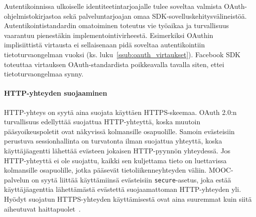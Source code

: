 \documentclass[finnish,gradu]{tktltiki}
\begin{document}
  Autentikoinnissa ulkoiselle identiteetintarjoajalle tulee soveltaa valmista OAuth-oh\-jelmisto\-kirjastoa sekä palveluntarjoajan omaa SDK-sovel\-lus\-kehitys\-välineistöä. Autentikointistandardin omatoiminen toteutus vie työaikaa ja turvallisuus vaarantuu pienestäkin implementointivirheestä. Esimerkiksi OAuthin implisiittistä virtausta ei sellaisenaan pidä soveltaa autentikointiin tietoturvaongelman vuoksi (ks. luku~\ref{ssub:oauth_virtaukset}). Facebook SDK toteuttaa virtauksen OAuth-standardista poikkeavalla tavalla siten, ettei tietoturvaongelmaa synny.


  \paragraph{HTTP-yhteyden suojaaminen} \hfill %
  \label{par:http_yhteyden_suojaaminen}

  HTTP-yhteys on syytä aina suojata käyttäen HTTPS-skeemaa. OAuth 2.0:n turvallisuus edellyttää suojattua HTTP-yhteyttä, koska muutoin pääsyoikeuspoletit ovat näkyvissä kolmansille osapuolille. Samoin evästeisiin perustuva sessionhallinta on turvatonta ilman suojattua yhteyttä, koska käyttäjäagentti lähettää evästeen jokaisen HTTP-pyynnön yhteydessä. Jos HTTP-yhteyttä ei ole suojattu, kaikki sen kuljettama tieto on luettavissa kolmansille osapuolille, jotka pääsevät tietoliikenneyhteyden väliin. MOOC-palvelun on syytä liittää käyttämiinsä evästeisiin \verb!secure!-asetus, joka estää käyttäjäagenttia lähettämästä evästettä suojaamattoman HTTP-yhteyden yli. Hyödyt suojatun HTTPS-yhteyden käyttämisestä ovat aina suuremmat kuin siitä aiheutuvat haittapuolet~\cite{oauthwg_ssl_discussion_2010}.








\end{document}
